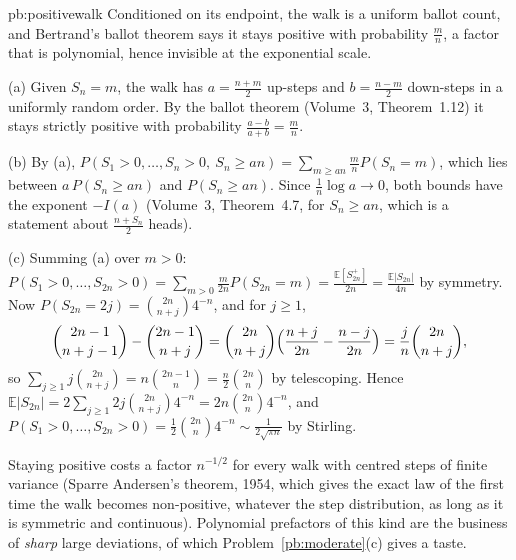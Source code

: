 \begin{solution}{pb:positivewalk}
\idea Conditioned on its endpoint, the walk is a uniform ballot count, and Bertrand's ballot theorem says it stays positive with probability $\frac mn$, a factor that is
polynomial, hence invisible at the exponential scale.

\writeup (a) Given $S_n=m$, the walk has $a=\frac{n+m}2$ up-steps and $b=\frac{n-m}2$ down-steps in a uniformly random order. By the ballot theorem (Volume~3, Theorem~1.12) it stays
strictly positive with probability $\frac{a-b}{a+b}=\frac mn$.

(b) By (a), $P(S_1>0,\dots,S_n>0,\ S_n\ge an)=\sum_{m\ge an}\frac mnP(S_n=m)$, which lies between $a\,P(S_n\ge an)$ and $P(S_n\ge an)$. Since $\frac1n\log a\to0$, both bounds
have the exponent $-I(a)$ (Volume~3, Theorem~4.7, for $S_n\ge an$, which is a statement about $\frac{n+S_n}2$ heads).

(c) Summing (a) over $m>0$: $P(S_1>0,\dots,S_{2n}>0)=\sum_{m>0}\frac m{2n}P(S_{2n}=m)=\frac{\mathbb E[S_{2n}^+]}{2n}=\frac{\mathbb E|S_{2n}|}{4n}$ by symmetry. Now
$P(S_{2n}=2j)=\binom{2n}{n+j}4^{-n}$, and for $j\ge1$,
\[
\binom{2n-1}{n+j-1}-\binom{2n-1}{n+j}=\binom{2n}{n+j}\Bigl(\frac{n+j}{2n}-\frac{n-j}{2n}\Bigr)=\frac jn\binom{2n}{n+j},
\]
so $\sum_{j\ge1}j\binom{2n}{n+j}=n\binom{2n-1}n=\frac n2\binom{2n}n$ by telescoping. Hence $\mathbb E|S_{2n}|=2\sum_{j\ge1}2j\binom{2n}{n+j}4^{-n}=2n\binom{2n}n4^{-n}$, and
$P(S_1>0,\dots,S_{2n}>0)=\frac12\binom{2n}n4^{-n}\sim\frac1{2\sqrt{\pi n}}$ by Stirling.

\leads Staying positive costs a factor $n^{-1/2}$ for every walk with centred steps of finite variance (Sparre Andersen's theorem, 1954, which gives the exact law of the
first time the walk becomes non-positive, whatever the step distribution, as long as it is symmetric and continuous). Polynomial prefactors of this kind are the business of
\emph{sharp} large deviations, of which Problem~\ref{pb:moderate}(c) gives a taste.
\end{solution}

